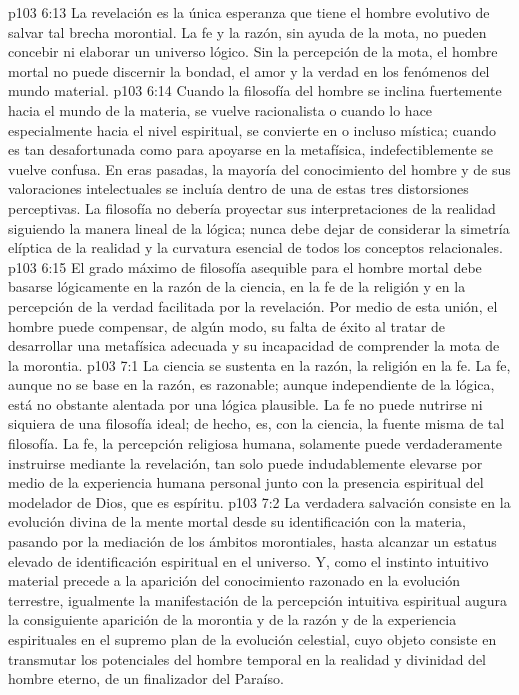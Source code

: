 \vs p103 6:13 La revelación es la única esperanza que tiene el hombre evolutivo de salvar tal brecha morontial. La fe y la razón, sin ayuda de la mota, no pueden concebir ni elaborar un universo lógico. Sin la percepción de la mota, el hombre mortal no puede discernir la bondad, el amor y la verdad en los fenómenos del mundo material.
\vs p103 6:14 Cuando la filosofía del hombre se inclina fuertemente hacia el mundo de la materia, se vuelve racionalista o  cuando lo hace especialmente hacia el nivel espiritual, se convierte en  o incluso mística; cuando es tan desafortunada como para apoyarse en la metafísica, indefectiblemente se vuelve  confusa. En eras pasadas, la mayoría del conocimiento del hombre y de sus valoraciones intelectuales se incluía dentro de una de estas tres distorsiones perceptivas. La filosofía no debería proyectar sus interpretaciones de la realidad siguiendo la manera lineal de la lógica; nunca debe dejar de considerar la simetría elíptica de la realidad y la curvatura esencial de todos los conceptos relacionales.
\vs p103 6:15 El grado máximo de filosofía asequible para el hombre mortal debe basarse lógicamente en la razón de la ciencia, en la fe de la religión y en la percepción de la verdad facilitada por la revelación. Por medio de esta unión, el hombre puede compensar, de algún modo, su falta de éxito al tratar de desarrollar una metafísica adecuada y su incapacidad de comprender la mota de la morontia.
\vs p103 7:1 La ciencia se sustenta en la razón, la religión en la fe. La fe, aunque no se base en la razón, es razonable; aunque independiente de la lógica, está no obstante alentada por una lógica plausible. La fe no puede nutrirse ni siquiera de una filosofía ideal; de hecho, es, con la ciencia, la fuente misma de tal filosofía. La fe, la percepción religiosa humana, solamente puede verdaderamente instruirse mediante la revelación, tan solo puede indudablemente elevarse por medio de la experiencia humana personal junto con la presencia espiritual del modelador de Dios, que es espíritu.
\vs p103 7:2 \pc La verdadera salvación consiste en la evolución divina de la mente mortal desde su identificación con la materia, pasando por la mediación de los ámbitos morontiales, hasta alcanzar un estatus elevado de identificación espiritual en el universo. Y, como el instinto intuitivo material precede a la aparición del conocimiento razonado en la evolución terrestre, igualmente la manifestación de la percepción intuitiva espiritual augura la consiguiente aparición de la morontia y de la razón y de la experiencia espirituales en el supremo plan de la evolución celestial, cuyo objeto consiste en transmutar los potenciales del hombre temporal en la realidad y divinidad del hombre eterno, de un finalizador del Paraíso.
